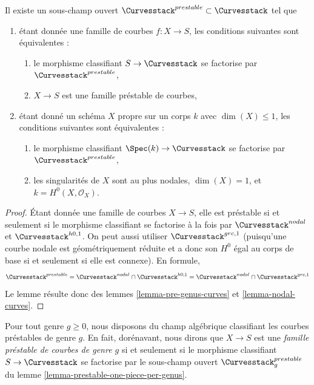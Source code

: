 \begin{lemma}
\label{lemma-prestable-curves}
Il existe un sous-champ ouvert $\Curvesstack^{prestable} \subset \Curvesstack$
tel que
\begin{enumerate}
\item étant donnée une famille de courbes $f : X \to S$, les conditions suivantes sont équivalentes :
\begin{enumerate}
\item le morphisme classifiant $S \to \Curvesstack$ se factorise
par $\Curvesstack^{prestable}$,
\item $X \to S$ est une famille préstable de courbes,
\end{enumerate}
\item étant donné un schéma $X$ propre sur un corps $k$ avec
$\dim(X) \leq 1$, les conditions suivantes sont équivalentes :
\begin{enumerate}
\item le morphisme classifiant $\Spec(k) \to \Curvesstack$
se factorise par $\Curvesstack^{prestable}$,
\item les singularités de $X$ sont au plus nodales, $\dim(X) = 1$,
et $k = H^0(X, \mathcal{O}_X)$.
\end{enumerate}
\end{enumerate}
\end{lemma}

\begin{proof}
Étant donnée une famille de courbes $X \to S$, elle est préstable si
et seulement si le morphisme classifiant se factorise à la fois par
$\Curvesstack^{nodal}$ et $\Curvesstack^{h0, 1}$. On peut aussi
utiliser $\Curvesstack^{grc, 1}$ (puisqu'une courbe nodale est géométriquement
réduite et a donc son $H^0$ égal au corps de base si et seulement si
elle est connexe). En formule,
$$
\Curvesstack^{prestable} =
\Curvesstack^{nodal} \cap \Curvesstack^{h0, 1} =
\Curvesstack^{nodal} \cap \Curvesstack^{grc, 1}
$$
Le lemme résulte donc des
lemmes \ref{lemma-pre-genus-curves} et \ref{lemma-nodal-curves}.
\end{proof}

\noindent
Pour tout genre $g \geq 0$, nous disposons du champ algébrique classifiant
les courbes préstables de genre $g$. En fait, dorénavant, nous dirons
que $X \to S$ est une {\it famille préstable de courbes de genre $g$}
si et seulement si le morphisme classifiant $S \to \Curvesstack$ se factorise par
le sous-champ ouvert $\Curvesstack^{prestable}_g$ du
lemme \ref{lemma-prestable-one-piece-per-genus}.

